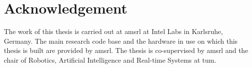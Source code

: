 \chapter{Acknowledgement}\label{ch:ackonwledgement}

The work of this thesis is carried out at \gls{amsrl} at Intel Labs in Karlsruhe, Germany. The main research code base and the hardware in use on which this thesis is built are provided by \gls{amsrl}. The thesis is co-supervised by \gls{amsrl} and the chair of Robotics, Artificial Intelligence and Real-time Systems at \gls{tum}. 
